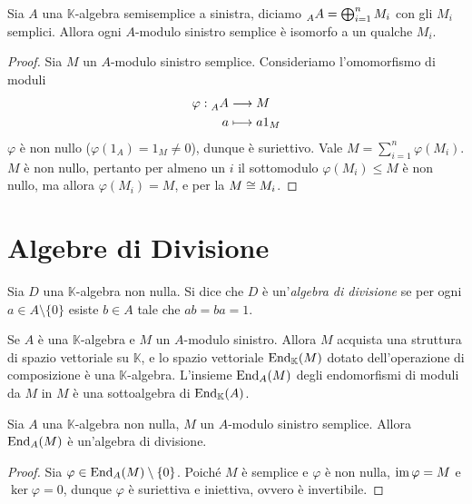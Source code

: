 \begin{proposition}
Sia $A$ una $\mathbb{K}$-algebra semisemplice a sinistra, diciamo $\prescript{}{A}{A}=\bigoplus_{i=1}^{n}M_i$ con gli $M_i$ semplici. Allora ogni $A$-modulo sinistro semplice è isomorfo a un qualche $M_i$.
\end{proposition}
\begin{proof}
Sia $M$ un $A$-modulo sinistro semplice. Consideriamo l'omomorfismo di moduli
\begin{align*}
\varphi:\prescript{}{A}{A}&\longrightarrow M\\
a&\longmapsto a1_M
\end{align*}
$\varphi$ è non nullo ($\varphi(1_A)=1_M\neq 0$), dunque è suriettivo. Vale $M=\sum_{i=1}^{n}\varphi(M_i)$. $M$ è non nullo, pertanto per almeno un $i$ il sottomodulo $\varphi(M_i)\le M$ è non nullo, ma allora $\varphi(M_i)=M$, e per la  $M\cong M_i$.
\end{proof}


\section{Algebre di Divisione}

\begin{definition}
Sia $D$ una $\mathbb{K}$-algebra non nulla. Si dice che $D$ è un'\emph{algebra di divisione} se per ogni $a\in A\setminus\{0\}$ esiste $b\in A$ tale che $ab=ba=1$.
\end{definition}


Se $A$ è una $\mathbb{K}$-algebra e $M$ un $A$-modulo sinistro. Allora $M$ acquista una struttura di spazio vettoriale su $\mathbb{K}$, e lo spazio vettoriale $\operatorname{End}_\mathbb{K}(M)$ dotato dell'operazione di composizione è una $\mathbb{K}$-algebra. L'insieme $\operatorname{End}_A(M)$ degli endomorfismi di moduli da $M$ in $M$ è una sottoalgebra di $\operatorname{End}_\mathbb{K}(A)$.


\begin{proposition}
Sia $A$ una $\mathbb{K}$-algebra non nulla, $M$ un $A$-modulo sinistro semplice. Allora $\operatorname{End}_A(M)$ è un'algebra di divisione.
\end{proposition}
\begin{proof}
Sia $\varphi\in\operatorname{End}_A(M)\setminus\{0\}$. Poiché $M$ è semplice e $\varphi$ è non nulla, $\operatorname{im}\varphi=M$ e $\ker\varphi=0$, dunque $\varphi$ è suriettiva e iniettiva, ovvero è invertibile.
\end{proof}


